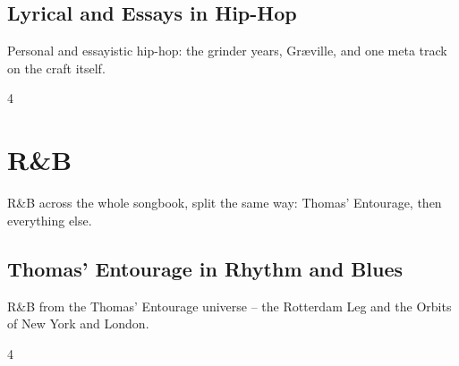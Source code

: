 \documentclass[a4paper,landscape]{memoir}
\begin{document}
\chapter{Lyrical and Essays in Hip-Hop}
Personal and essayistic hip-hop: the grinder years, Græville, and one meta track on the craft itself.
\clearpage\begin{multicols*}{4}
\end{multicols*}

\part{R\&B}
R\&B across the whole songbook, split the same way: Thomas' Entourage, then everything else.

\chapter{Thomas' Entourage in Rhythm and Blues}
R\&B from the Thomas' Entourage universe -- the Rotterdam Leg and the Orbits of New York and London.
\clearpage\begin{multicols*}{4}
\end{multicols*}
\end{document}
